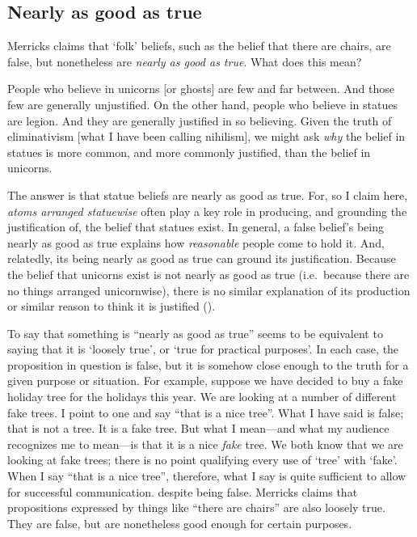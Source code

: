 \documentclass[11pt]{article}
\newenvironment{squote}{%
\begin{spacing}{1}
       	\begin{list}{}{%
\setlength{\labelwidth}{0pt}%
\rightmargin\leftmargin%
}
\item\relax
}{%
\end{list}%
\end{spacing}
}
\begin{document}
\begin{spacing}{1.25}
\subsection{Nearly as good as true}
\label{near}
Merricks claims that `folk' beliefs, such as the belief that there are
chairs, are false, but nonetheless are {\em nearly as good as true}.
What does this mean?

\begin{squote}
People who believe in unicorns [or ghosts] are few and far between.
And those few are generally unjustified.  On the other hand, people
who believe in statues are legion.  And they are generally justified
in so believing.  Given the truth of eliminativism [what I have been
  calling nihilism], we might ask {\em why} the belief in statues is
more common, and more commonly justified, than the belief in unicorns.

The answer is that statue beliefs are nearly as good as true.  For, so
I claim here, {\em atoms arranged statuewise} often play a key role in
producing, and grounding the justification of, the belief that statues
exist.  In general, a false belief's being nearly as good as true
explains how {\em reasonable} people come to hold it.  And, relatedly,
its being nearly as good as true can ground its justification.
Because the belief that unicorns exist is not nearly as good as true
(i.e.\ because there are no things arranged unicornwise), there is no
similar explanation of its production or similar reason to think it is
justified (\citeyear[171--172]{merricks2001a}).
\end{squote}

To say that something is ``nearly as good as true'' seems to be
equivalent to saying that it is `loosely true', or `true for practical
purposes'.  In each case, the proposition in question is false, but it
is somehow close enough to the truth for a given purpose or situation.
For example, suppose we have decided to buy a fake holiday tree for
the holidays this year.  We are looking at a number of different fake
trees.  I point to one and say ``that is a nice tree''.  What I have
said is false; that is not a tree.  It is a fake tree.  But what I
mean---and what my audience recognizes me to mean---is that it is a
nice {\em fake} tree.  We both know that we are looking at fake trees;
there is no point qualifying every use of `tree' with `fake'.  When I
say ``that is a nice tree'', therefore, what I say is quite sufficient
to allow for successful communication. despite being false.  Merricks
claims that propositions expressed by things like ``there are chairs''
are also loosely true.  They are false, but are nonetheless good
enough for certain purposes.


\end{spacing}
\end{document}
